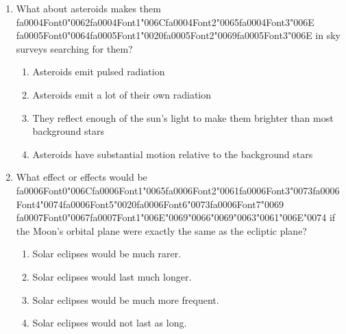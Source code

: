 \documentclass[12pt]{article}
\begin{document}
\begin{enumerate}[label=\arabic*.]
\begin{enumerate}[label=(\alph*)]
    \item Complex organic molecules specifically PAHs
    \item Magnetite grains similar to those formed by bacteria on Earth
    \item Carbonate minerals indicating a thicker warmer Martian atmosphere
    \item Amino acids with a preferred orientation or "chirality"
\end{enumerate}
\item What about asteroids makes them {\csname fa0004Font0\endcsname\char"0062}{\csname fa0004Font1\endcsname\char"006C}{\csname fa0004Font2\endcsname\char"0065}{\csname fa0004Font3\endcsname\char"006E} {\csname fa0005Font0\endcsname\char"0064}{\csname fa0005Font1\endcsname\char"0020}{\csname fa0005Font2\endcsname\char"0069}{\csname fa0005Font3\endcsname\char"006E} in sky surveys searching for them?
\begin{enumerate}[label=(\alph*)]
    \item Asteroids emit pulsed radiation
    \item Asteroids emit a lot of their own radiation
    \item They reflect enough of the sun's light to make them brighter than most background stars
    \item Asteroids have substantial motion relative to the background stars
\end{enumerate}
\item What effect or effects would be {\csname fa0006Font0\endcsname\char"006C}{\csname fa0006Font1\endcsname\char"0065}{\csname fa0006Font2\endcsname\char"0061}{\csname fa0006Font3\endcsname\char"0073}{\csname fa0006Font4\endcsname\char"0074}{\csname fa0006Font5\endcsname\char"0020}{\csname fa0006Font6\endcsname\char"0073}{\csname fa0006Font7\endcsname\char"0069} {\csname fa0007Font0\endcsname\char"0067}{\csname fa0007Font1\endcsname\char"006E}{\char"0069}{\char"0066}{\char"0069}{\char"0063}{\char"0061}{\char"006E}{\char"0074} if the Moon's orbital plane were exactly
the same as the ecliptic plane?
\begin{enumerate}[label=(\alph*)]
    \item Solar eclipses would be much rarer.
    \item Solar eclipses would last much longer.
    \item Solar eclipses would be much more frequent.
    \item Solar eclipses would not last as long.
\end{enumerate}
\end{enumerate}
\end{document}
